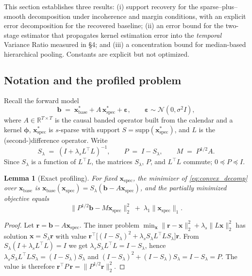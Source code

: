 \documentclass[10pt]{article} %
\theoremstyle{plain}
\newtheorem{lemma}{Lemma}
\theoremstyle{definition}
\begin{document}
This section establishes three results: (i) support recovery for the
sparse--plus--smooth decomposition under incoherence and margin
conditions, with an explicit error decomposition for the recovered
baseline; (ii) an error bound for the two-stage estimator that
propagates kernel estimation error into the \emph{temporal} Variance
Ratio measured in \S4; and (iii) a concentration bound for
median-based hierarchical pooling. Constants are explicit but not
optimized.

\subsection{Notation and the profiled problem}
\label{app:theory-setup}

Recall the forward model
\begin{equation}
\mathbf{b} \;=\; \mathbf{x}^{*}_{\mathrm{base}}
+ A\,\mathbf{x}^{*}_{\mathrm{spec}} + \boldsymbol{\varepsilon},
\qquad \boldsymbol{\varepsilon} \sim \mathcal{N}(0,\sigma^{2} I),
\label{eq:model-app}
\end{equation}
where $A \in \mathbb{R}^{T\times T}$ is the causal banded operator
built from the calendar and a kernel $\boldsymbol{\phi}$,
$\mathbf{x}^{*}_{\mathrm{spec}}$ is $s$-sparse with support
$S = \mathrm{supp}(\mathbf{x}^{*}_{\mathrm{spec}})$, and $L$ is the
(second-)difference operator. Write
\begin{equation}
S_{\lambda} \;=\; (I + \lambda_{s} L^{\top}L)^{-1},
\qquad
P \;=\; I - S_{\lambda},
\qquad
M \;=\; P^{1/2} A .
\end{equation}
Since $S_{\lambda}$ is a function of $L^{\top}L$, the matrices
$S_{\lambda}$, $P$, and $L^{\top}L$ commute; $0 \preceq P \preceq I$.

\begin{lemma}[Exact profiling]
\label{lem:profile}
For fixed $\mathbf{x}_{\mathrm{spec}}$, the minimizer of
\eqref{eq:convex_decomp} over $\mathbf{x}_{\mathrm{base}}$ is
$\mathbf{x}_{\mathrm{base}}(\mathbf{x}_{\mathrm{spec}})
= S_{\lambda}(\mathbf{b} - A\mathbf{x}_{\mathrm{spec}})$, and the
partially minimized objective equals
\begin{equation}
\bigl\| P^{1/2}\mathbf{b} - M \mathbf{x}_{\mathrm{spec}} \bigr\|_{2}^{2}
\;+\; \lambda_{1} \|\mathbf{x}_{\mathrm{spec}}\|_{1}.
\label{eq:profiled}
\end{equation}
\end{lemma}

\begin{proof}
Let $\mathbf{r} = \mathbf{b} - A\mathbf{x}_{\mathrm{spec}}$. The inner
problem $\min_{\mathbf{x}} \|\mathbf{r}-\mathbf{x}\|_{2}^{2}
+ \lambda_{s}\|L\mathbf{x}\|_{2}^{2}$ has solution
$\mathbf{x} = S_{\lambda}\mathbf{r}$ with value
$\mathbf{r}^{\top}\!\bigl[(I-S_{\lambda})^{2}
+ \lambda_{s} S_{\lambda} L^{\top} L S_{\lambda}\bigr]\mathbf{r}$.
From $S_{\lambda}(I + \lambda_{s}L^{\top}L) = I$ we get
$\lambda_{s} S_{\lambda} L^{\top}L = I - S_{\lambda}$, hence
$\lambda_{s} S_{\lambda}L^{\top}L S_{\lambda} = (I-S_{\lambda})S_{\lambda}$
and
$(I-S_{\lambda})^{2} + (I-S_{\lambda})S_{\lambda} = I - S_{\lambda} = P$.
The value is therefore $\mathbf{r}^{\top} P\,\mathbf{r}
= \|P^{1/2}\mathbf{r}\|_{2}^{2}$.
\end{proof}
\end{document}
